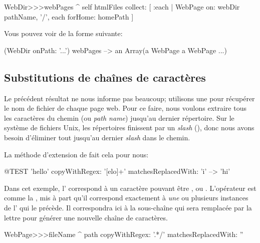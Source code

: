 \documentclass[a4paper,10pt,twoside]{book}
\begin{document}
\begin{code}{}
WebDir>>>webPages
	^ self htmlFiles collect: 
		[ :each | WebPage 
			on: webDir pathName, '/', each
			forHome: homePath ]
\end{code}

Vous pouvez voir de la forme suivante:

\begin{code}{}
(WebDir onPath: '...') webPages --> an Array(a WebPage a WebPage ...)
\end{code}

\subsection{Substitutions de chaînes de caractères}

Le précédent résultat ne nous informe pas beaucoup; utilisons une
\expreg pour récupérer le nom de fichier de chaque page web.
Pour ce faire, nous voulons extraire tous les caractères du chemin (ou
\emph{path name}) jusqu'au dernier répertoire. Sur le système de
fichiers Unix, les répertoires finissent par un \emph{slash} (\ct{/}),
donc nous avons besoin d'éliminer tout jusqu'au dernier \emph{slash}
dans le chemin.

La méthode d'extension de 
 fait cela pour
nous:

\begin{code}{@TEST}
'hello' copyWithRegex: '[elo]+' matchesReplacedWith: 'i' --> 'hi'
\end{code}

Dans cet exemple, l'\expreg \ct{[elo]} correspond à un caractère
pouvant être ,  ou . %
L'opérateur \ct{+} est comme la \kleenestar, mis à part qu'il
correspond exactement à \emph{une} ou plusieurs instances de l'\expreg
qui le précède. Il correspondra ici à la sous-chaîne  qui
sera remplacée par la lettre  pour générer une nouvelle chaîne de
caractères.


\begin{code}{}
WebPage>>>fileName
	^ path copyWithRegex: '.*/' matchesReplacedWith: ''
\end{code}
\end{document}
